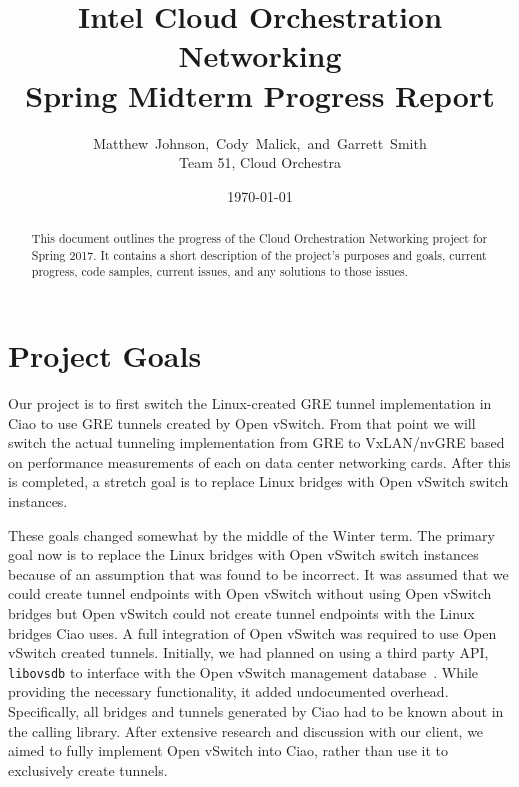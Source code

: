 \documentclass[10pt,onecolumn,journal,draftclsnofoot]{IEEEtran}
\begin{document}
\begin{titlepage}
	\title{Intel Cloud Orchestration Networking\\ Spring Midterm Progress Report}
	\author{Matthew~Johnson,~Cody~Malick,~and~Garrett~Smith\\
		Team 51, Cloud Orchestra}
	\date{\today}
	\maketitle
	\vspace{4cm}
	\begin{abstract}
		\noindent This document outlines the progress of the Cloud
		Orchestration Networking project for Spring 2017. It contains
		a short description of the project's purposes
		and goals, current progress, code samples, current issues,
		and any solutions to those issues. \end{abstract}

\end{titlepage}
\tableofcontents
\clearpage

\section{Project Goals}

Our project is to first switch the Linux-created GRE tunnel implementation in
Ciao to use GRE tunnels created by Open vSwitch. From that point we will switch
the actual tunneling implementation from GRE to VxLAN/nvGRE based on performance
measurements of each on data center networking cards. After this is completed, a
stretch goal is to replace Linux bridges with Open vSwitch switch instances.

These goals changed somewhat by the middle of the Winter term. The primary goal
now is to replace the Linux bridges with Open vSwitch switch instances because
of an assumption that was found to be incorrect. It was assumed that we could 
create tunnel endpoints with Open vSwitch without using Open vSwitch bridges 
but Open vSwitch could not create tunnel endpoints with the Linux bridges 
Ciao uses. A full
integration of Open vSwitch was required to use Open vSwitch created tunnels. 
Initially, we had planned on using
a third party API, \texttt{libovsdb} to interface with the Open vSwitch
management database~\cite{libovsdb}. While providing the necessary
functionality, it added undocumented overhead. Specifically, all bridges and
tunnels generated by Ciao had to be known about in the calling library. After
extensive research and discussion with our client, we aimed to fully implement
Open vSwitch into Ciao, rather than use it to exclusively create tunnels.
\end{document}
